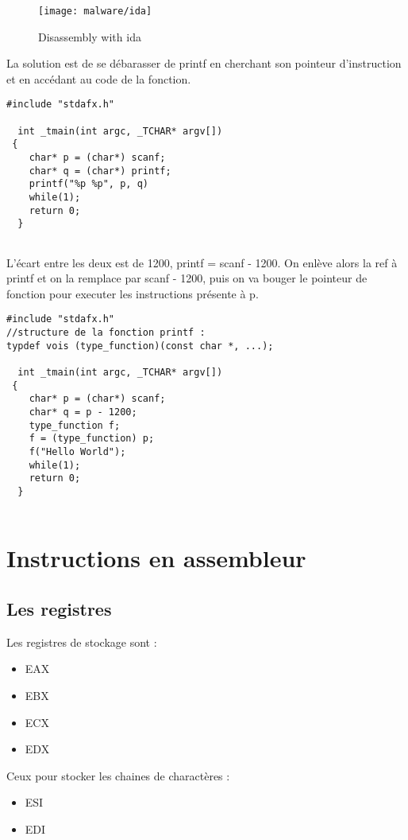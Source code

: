 \documentclass[a4paper,10pt]{article}
\begin{document}
\begin{figure}[h!]
 \centering	
 \texttt{[image: malware/ida]}
 \caption{Disassembly with ida}
\end{figure}

La solution est de se débarasser de printf en cherchant son pointeur d'instruction et en accédant au code de la fonction.

\begin{lstlisting}
#include "stdafx.h"
  
  int _tmain(int argc, _TCHAR* argv[])
 {
    char* p = (char*) scanf;
    char* q = (char*) printf;
    printf("%p %p", p, q)
    while(1);
    return 0;
  }
 
\end{lstlisting}

L'écart entre les deux est de 1200, printf = scanf - 1200.
On enlève alors la ref à printf et on la remplace par scanf - 1200, puis on va bouger le pointeur de fonction pour executer les instructions présente à p.

\begin{lstlisting}
#include "stdafx.h"
//structure de la fonction printf : 
typdef vois (type_function)(const char *, ...); 

  int _tmain(int argc, _TCHAR* argv[])
 {
    char* p = (char*) scanf;
    char* q = p - 1200;
    type_function f;
    f = (type_function) p;
    f("Hello World");
    while(1);
    return 0;
  }
 
\end{lstlisting}

\section{Instructions en assembleur}

\subsection{Les registres}

Les registres de stockage sont :
\begin{itemize}
 \item EAX
 \item EBX
 \item ECX
 \item EDX
\end{itemize}

Ceux pour stocker les chaines de charactères : 
\begin{itemize}
 \item ESI
 \item EDI
\end{itemize}
\end{document}
